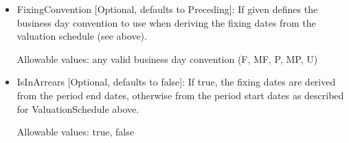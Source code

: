 \begin{itemize}
\begin{itemize}
\item FixingConvention [Optional, defaults to Preceding]: If given defines the business day convention to use when
  deriving the fixing dates from the valuation schedule (see above).

  Allowable values: any valid business day convention (F, MF, P, MP, U)

\item IsInArrears [Optional, defaults to false]: If true, the fixing dates are derived from the period end dates,
  otherwise from the period start dates as described for ValuationSchedule above.

  Allowable values: true, false

\end{itemize}

\end{itemize}
